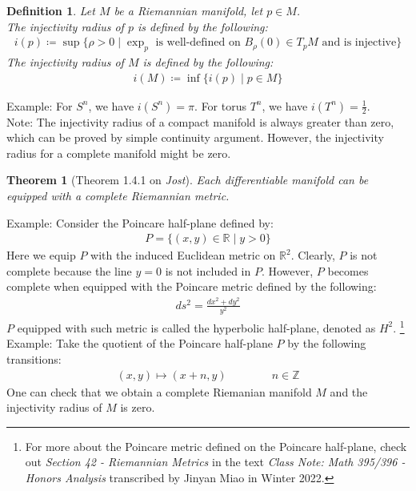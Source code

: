 \documentclass[11pt]{book}
\theoremstyle{break}
\theoremstyle{break}
\newtheorem{thm}{Theorem}[section]
\newtheorem{defn}{Definition}[corL]
\newcommand{\R}{\mathbb{R}}
\newcommand{\Z}{\mathbb{Z}}
\newcommand{\note}{\color{red}Note: \color{black}}
\newcommand{\example}{\color{green}Example: \color{black}}
\begin{document}
\begin{defn}
Let $M$ be a Riemannian manifold, let $p \in M$. \\
The injectivity radius of $p$ is defined by the following:
\begin{align*}
i(p) \coloneqq \sup\{\rho >0 \mid \exp_p\text{ is well-defined on }B_\rho(0) \in T_pM \text{ and is injective}\}
\end{align*}
The injectivity radius of $M$ is defined by the following:
\begin{align*}
i(M) \coloneqq \inf\{i(p) \mid p \in M\}
\end{align*}
\end{defn}

\example For $S^n$, we have $i(S^n) = \pi$. For torus $T^n$, we have $i(T^n) = \frac{1}{2}$. \\

\note The injectivity radius of a compact manifold is always greater than zero, which can be proved by simple continuity argument. However, the injectivity radius for a complete manifold might be zero. \\



\begin{thm}[Theorem 1.4.1 on \textit{Jost}]
Each differentiable manifold can be equipped with a complete Riemannian metric. 
\end{thm}

\example Consider the Poincare half-plane defined by:
\begin{align*}
P = \{(x,y) \in \R \mid y>0\}
\end{align*}
Here we equip $P$ with the induced Euclidean metric on $\R^2$. Clearly, $P$ is not complete because the line $y = 0$ is not included in $P$. However, $P$ becomes complete when equipped with the Poincare metric defined by the following:
\begin{align*}
ds^2 = \frac{dx^2 + dy^2}{y^2}
\end{align*}  
$P$ equipped with such metric is called the hyperbolic half-plane, denoted as $H^2$. \footnote{For more about the Poincare metric defined on the Poincare half-plane, check out \textit{Section 42 - Riemannian Metrics }in the text \textit{Class Note: Math 395/396 - Honors Analysis} transcribed by Jinyan Miao in Winter 2022.}\\




\example Take the quotient of the Poincare half-plane $P$ by the following transitions:
\begin{align*}
(x,y)\mapsto (x+n,y) \qquad\qquad n\in \Z
\end{align*}
One can check that we obtain a complete Riemanian manifold $M$ and the injectivity radius of $M$ is zero.\\
\end{document}

